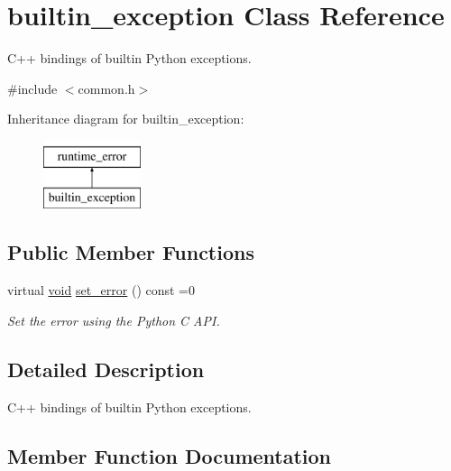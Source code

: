\hypertarget{classbuiltin__exception}{}\section{builtin\+\_\+exception Class Reference}
\label{classbuiltin__exception}


C++ bindings of builtin Python exceptions.  




{\ttfamily \#include $<$common.\+h$>$}

Inheritance diagram for builtin\+\_\+exception\+:\begin{figure}[H]
\begin{center}
\leavevmode
\includegraphics[height=2.000000cm]{classbuiltin__exception}
\end{center}
\end{figure}
\subsection*{Public Member Functions}
\begin{DoxyCompactItemize}
\item 
virtual \mbox{\hyperlink{_s_d_l__opengles2__gl2ext_8h_ae5d8fa23ad07c48bb609509eae494c95}{void}} \mbox{\hyperlink{classbuiltin__exception_a1a12a564ae0fd4687e2f491c36d1133b}{set\+\_\+error}} () const =0
\begin{DoxyCompactList}\small\item\em Set the error using the Python C A\+PI. \end{DoxyCompactList}\end{DoxyCompactItemize}


\subsection{Detailed Description}
C++ bindings of builtin Python exceptions. 

\subsection{Member Function Documentation}
\mbox{\label{classbuiltin__exception_a1a12a564ae0fd4687e2f491c36d1133b}} 

